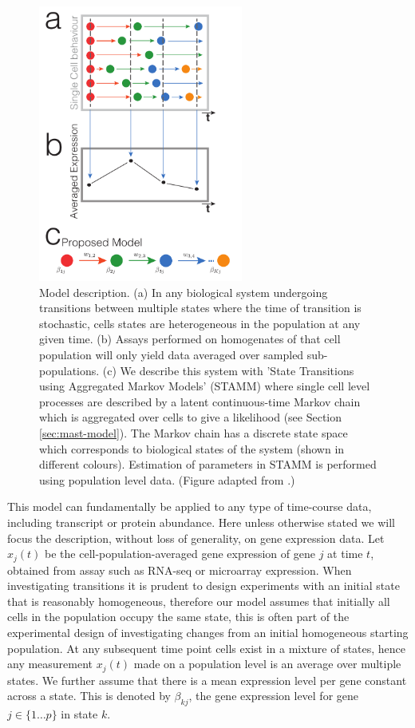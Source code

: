 \begin{figure}[!t]
  \centering
  \includegraphics[width=0.6\textwidth]{pics/model_fig.pdf}
  \caption{Model description. (a) In any biological system undergoing transitions between multiple states where the time of transition is stochastic, cells states are heterogeneous in the population at any given time.  (b) Assays performed on homogenates of that cell population will only yield data averaged over sampled sub-populations. (c) We describe this system with 'State Transitions using Aggregated Markov Models' (STAMM) where single cell level processes are described by a latent continuous-time Markov chain which is aggregated over cells to give a likelihood (see Section \ref{sec:mast-model}). The Markov chain has a discrete state space which corresponds to biological states of the system (shown in different colours). Estimation of parameters in STAMM is performed using population level data. (Figure adapted from \cite{Armond:2013}.)  }
  \label{fig:model-sketch}
\end{figure}

This model can fundamentally be applied to any type of time-course data, including transcript or protein abundance. Here unless otherwise stated we will focus the description, without loss of generality, on gene expression data. Let $x_j(t)$ be the cell-population-averaged gene expression of gene $j$ at time $t$, obtained from assay
such as RNA-seq or microarray expression. When investigating transitions it is prudent to design experiments with an initial state that is reasonably homogeneous, therefore our model assumes that initially all cells in the population occupy the same state, this is often part of the experimental design of investigating changes from an initial homogeneous starting population. At any subsequent time point cells exist in a mixture of states, hence any measurement $x_j(t)$ made on a population level is an average over multiple states. We further assume that there is a mean expression level per gene constant across a state. This is denoted by $\beta_{kj}$, the gene expression level for gene $j \in \lbrace 1 \ldots p \rbrace$ in state $k$.

